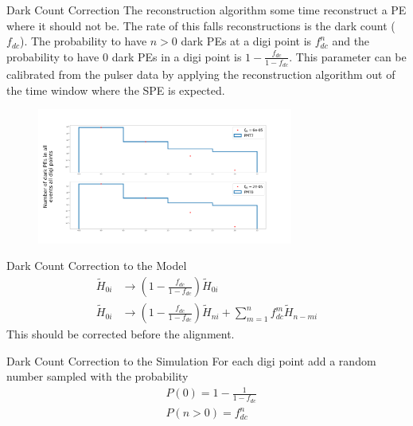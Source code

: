 \documentclass{beamer}
\begin{document}
\begin{frame}{Dark Count Correction}
The reconstruction algorithm some time reconstruct a PE where it should not be. The rate of this falls reconstructions is the dark count ($f_{dc}$). The probability to have $n>0$ dark PEs at a digi point is $f_{dc}^n$ and the probability to have 0 dark PEs in a digi point is $1-\frac{f_{dc}}{1-f_{dc}}$. This parameter can be calibrated from the pulser data by applying the reconstruction algorithm out of the time window where the SPE is expected.
\begin{figure}[h]
\includegraphics[width=0.75\textwidth]{f_dc.png}
\end{figure}
\end{frame}

\begin{frame}{Dark Count Correction to the Model}
\begin{equation}
\begin{split}
\tilde{H}_{0i}&\rightarrow \left(1-\frac{f_{dc}}{1-f_{dc}}\right)\tilde{H}_{0i}\\
\tilde{H}_{0i}&\rightarrow \left(1-\frac{f_{dc}}{1-f_{dc}}\right)\tilde{H}_{ni}+\sum_{m=1}^{n}f_{dc}^m\tilde{H}_{n-mi}
\end{split}
\end{equation}
This should be corrected before the alignment.
\end{frame}


\begin{frame}{Dark Count Correction to the Simulation}
For each digi point add a random number sampled with the probability
\begin{equation}
\begin{split}
&P(0)=1-\frac{1}{1-f_{dc}}\\
&P(n>0)=f_{dc}^n
\end{split}
\end{equation}
\end{frame}
\end{document}

